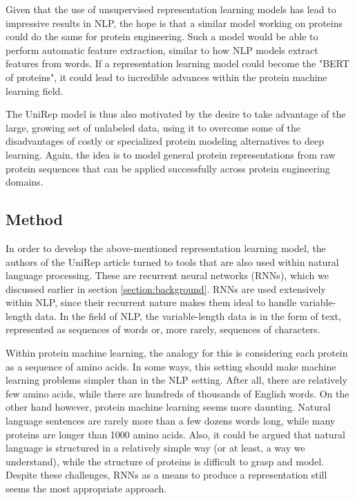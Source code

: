 \documentclass[a4paper,12pt]{article}
\begin{document}
Given that the use of unsupervised representation learning models has lead to impressive results in NLP, the hope is that a similar model working on proteins could do the same for protein engineering. Such a model would be able to perform automatic feature extraction, similar to how NLP models extract features from words. If a representation learning model could become the "BERT of proteins", it could lead to incredible advances within the protein machine learning field.

The UniRep model is thus also motivated by the desire to take advantage of the large, growing set of unlabeled data, using it to overcome some of the disadvantages of costly or specialized protein modeling alternatives to deep learning. Again, the idea is to model general protein representations from raw protein sequences that can be applied successfully across protein engineering domains.

\subsection{Method}
In order to develop the above-mentioned representation learning model, the authors of the UniRep article turned to tools that are also used within natural language processing. These are recurrent neural networks (RNNs), which we discussed earlier in section \ref{section:background}. RNNs are used extensively within NLP, since their recurrent nature makes them ideal to handle variable-length data. In the field of NLP, the variable-length data is in the form of text, represented as sequences of words or, more rarely, sequences of characters.

Within protein machine learning, the analogy for this is considering each protein as a sequence of amino acids. In some ways, this setting should make machine learning problems simpler than in the NLP setting. After all, there are relatively few amino acids, while there are hundreds of thousands of English words. On the other hand however, protein machine learning seems more daunting. Natural language sentences are rarely more than a few dozens words long, while many proteins are longer than 1000 amino acids. Also, it could be argued that natural language is structured in a relatively simple way (or at least, a way we understand), while the structure of proteins is difficult to grasp and model. Despite these challenges, RNNs as a means to produce a representation still seems the most appropriate approach.
\end{document}
